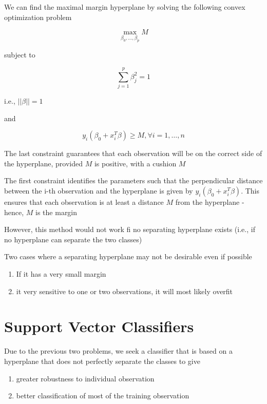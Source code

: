 \documentclass[
]{book}
\providecommand{\tightlist}{%
  \setlength{\itemsep}{0pt}\setlength{\parskip}{0pt}}
\begin{document}
We can find the maximal margin hyperplane by solving the following convex optimization problem

\[
\underset{\beta_0,\dots, \beta_p}{\operatorname{max}} M
\]

subject to

\[
\sum_{j = 1}^p \beta_j^2 = 1
\]

i.e., \(||\beta|| = 1\)

and

\[
y_i (\beta_0 + x_i^T \beta) \ge M,\forall i = 1, \dots, n
\]

The last constraint guarantees that each observation will be on the correct side of the hyperplane, provided \(M\) is positive, with a cushion \(M\)

The first constraint identifies the parameters such that the perpendicular distance between the i-th observation and the hyperplane is given by \(y_i (\beta_0 + x_i^T \beta)\). This ensures that each observation is at least a distance \(M\) from the hyperplane - hence, \(M\) is the margin

However, this method would not work fi no separating hyperplane exists (i.e., if no hyperplane can separate the two classes)

Two cases where a separating hyperplane may not be desirable even if possible

\begin{enumerate}
\def\labelenumi{\arabic{enumi}.}
\tightlist
\item
  If it has a very small margin
\item
  it very sensitive to one or two observations, it will most likely overfit
\end{enumerate}

\hypertarget{support-vector-classifiers}{%
\section{Support Vector Classifiers}\label{support-vector-classifiers}}

Due to the previous two problems, we seek a classifier that is based on a hyperplane that does not perfectly separate the classes to give

\begin{enumerate}
\def\labelenumi{\arabic{enumi}.}
\tightlist
\item
  greater robustness to individual observation
\item
  better classification of most of the training observation
\end{enumerate}
\end{document}
